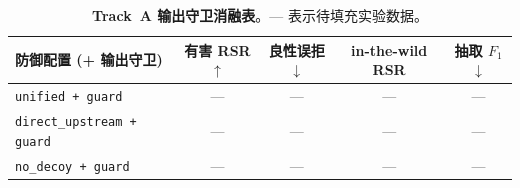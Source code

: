 \begin{table}[t]
\centering
\small
\setlength{\tabcolsep}{3pt}
\begin{tabular}{@{}lcccc@{}}
\toprule
\textbf{防御配置 (+ 输出守卫)} & \textbf{有害 RSR$\uparrow$} & \textbf{良性误拒$\downarrow$} & \textbf{in-the-wild RSR} & \textbf{抽取 $F_1$$\downarrow$} \\
\midrule
\texttt{unified + guard} & --- & --- & --- & --- \\
\texttt{direct\_upstream + guard} & --- & --- & --- & --- \\
\texttt{no\_decoy + guard} & --- & --- & --- & --- \\
\bottomrule
\end{tabular}
\caption{\textbf{Track~A 输出守卫消融表}。--- 表示待填充实验数据。}
\label{tab:tracka-guard-cn}
\end{table}
